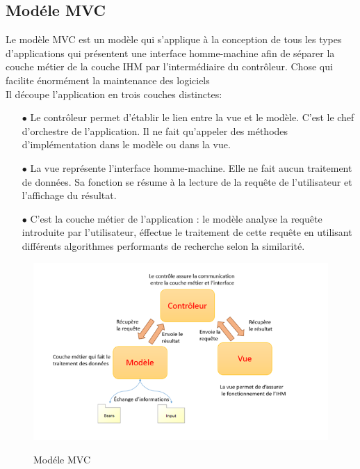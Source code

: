     \subsection{Modéle MVC}
        Le modèle MVC est un modèle qui s'applique à la conception de tous les types d'applications qui présentent une interface homme-machine afin de séparer la couche métier de la couche IHM par l'intermédiaire du contrôleur. Chose qui facilite énormément la maintenance des logiciels\\
        Il découpe  l'application en trois couches distinctes:\\
        \begin{itemize}
            \item[\quad $\bullet$]
            Le contrôleur permet d’établir le lien entre la vue et le modèle. C’est le chef d’orchestre de l’application. Il ne fait qu’appeler des méthodes d'implémentation dans le  modèle ou dans la vue.
            \item[\quad $\bullet$]La vue représente l’interface homme-machine. Elle ne fait aucun traitement de données. Sa fonction se résume à la lecture de la requête de l’utilisateur et l’affichage du résultat.
            \item[\quad $\bullet$]C’est la couche métier de l’application : le modèle analyse la requête introduite par l’utilisateur, éffectue le traitement de cette requête en utilisant différents algorithmes performants de recherche selon la similarité.
        \end{itemize}
        \begin{figure}[H]
                    \centering
                    \includegraphics[width=17cm]{mvc}\\
                    \caption{Modéle MVC}\label{Modéle MVC}
        \end{figure}

